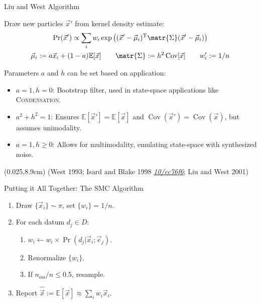 \documentclass[xcolor=dvipsnames, compress]{beamer}
\renewcommand\UrlFont{\color{red}\rmfamily\itshape}
\newcommand{\shortdoi}[1]{\href{http://doi.org/#1}{\UrlFont 10/#1}}
\newcommand{\T}{\mathrm{T}}
\newcommand{\Cov}{\operatorname{Cov}}
\newcommand{\expect}{\mathbb{E}}
\newcommand{\defeq}{\mathrel{:=}}
\newcommand{\bottomnote}[1]{
  \begin{textblock*}{0.95\paperwidth} (0.025\paperwidth,8.9cm)
    {\tiny \hfill #1}
  \end{textblock*}
}
\begin{document}
\begin{frame}{Liu and West Algorithm}
  
  Draw new particles $\vec{x}'$ from kernel density estimate:
  \begin{gather*}
    \Pr(\vec{x}') \propto \sum_i w_i \exp\left((\vec{x}' - \vec{\mu}_i)^\T\matr{\Sigma}(\vec{x}' - \vec{\mu}_i)\right) \\
    \vec{\mu}_i \defeq a \vec{x}_i + (1 - a) \mathbb{E}[\vec{x}] \qquad
    \matr{\Sigma} \defeq h^2 \Cov[\vec{x}] \qquad
    w_i' \defeq 1 / n
  \end{gather*}

  \pause

  Parameters $a$ and $h$ can be set based on application:
  \begin{itemize}
    \item $a = 1, h = 0$: Bootstrap filter, used in state-space applications
      like \textsc{Condensation}.
    \item $a^2 + h^2 = 1$: Ensures $\expect[\vec{x}'] = \expect[\vec{x}]$
      and $\Cov(\vec{x}') = \Cov(\vec{x})$, but assumes unimodality.
    \item $a = 1, h \ge 0$: Allows for multimodality, emulating state-space
      with synthesized noise.
  \end{itemize}
  
  \bottomnote{(West 1993;  Isard and Blake 1998 \shortdoi{cc76f6}; Liu and West 2001)}
  
\end{frame}

\begin{frame}{Putting it All Together: The SMC Algorithm}

  \begin{enumerate}
    \item Draw $\{\vec{x}_i\} \sim \pi$, set $\{w_i\} = 1/n$.
    \item For each datum $d_j \in D$:
    \begin{enumerate}
      \item $w_i \gets w_i \times \Pr(d_j | \vec{x}_i; \vec{e}_j)$.
      \item Renormalize $\{w_i\}$.
      \item If $n_{\text{ess}} / n \le 0.5$, resample.
    \end{enumerate}
    \item Report $\hat{\vec{x}} \defeq \expect[\vec{x}] \approx \sum_i w_i \vec{x}_i$.
  \end{enumerate}

\end{frame}
\end{document}

